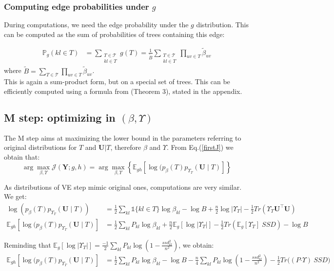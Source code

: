 \documentclass[11pt,a4paper]{article}
\newcommand{\argmax}{\arg\!\max}
\newcommand{\Ybf}{\boldsymbol{Y}}
\newcommand{\Ubf}{\boldsymbol{U}}
\newcommand{\Esp}{\mathds{E}}
\newcommand{\had}{\boldsymbol{\cdot}}
\begin{document}
\subsubsection{Computing edge probabilities under $g$}
During computations, we need the edge probability under the $g$ distribution. This can be computed as the sum of probabilities of trees containing this edge:

\begin{align*}
\mathds{P}_g(kl \in T)  &= \sum_{\substack{T  \in \mathcal{T} \\ kl \in T }} g(T) =\frac{1}{\widetilde{B}} \sum_{\substack{T  \in \mathcal{T} \\ kl \in T }} \prod_{uv \in T} \widetilde{\beta}_{uv}
\end{align*}
where $\displaystyle \widetilde{B}= \sum_{T \in \mathcal{T} }\prod_{uv \in T}  \widetilde{\beta}_{uv}$.\\

 This is again a sum-product form, but on a special set of trees. This can be efficiently computed using a formula from \citet{kirshner} (Theorem 3), stated in the appendix.
 
 
 \subsection{M step: optimizing in $(\beta, \Upsilon)$}
 The M step aims at maximizing the lower bound in the parameters referring to original distributions for $T$ and $\Ubf|T$, therefore $\beta$ and $\Upsilon$. From Eq.(\ref{firstJ}) we obtain that: 
$$ \argmax_{\beta, \Upsilon} \mathcal{J}(\Ybf ; g,h) =\argmax_{\beta, \Upsilon} \left\{ \Esp_{gh} [\log (p_\beta(T)p_{\Upsilon_T}(\Ubf\mid T) ]\right\} $$

As distributions of VE step mimic original ones, computations are very similar. We get:
\begin{align*}
\log (p_\beta(T)p_{\Upsilon_T}(\Ubf\mid T))  &= \frac{1}{2}\sum_{kl} \mathds{1}\{kl \in T\} \log \beta_{kl} - \log B + \frac{n}{2}\log |\Upsilon_T| - \frac{1}{2}Tr(\Upsilon_T \Ubf^\intercal \Ubf)\\
\Esp_{gh} [\log (p_\beta(T)p_{\Upsilon_T}(\Ubf\mid T) ] &= \frac{1}{2}\sum_{kl} P_{kl} \log\beta_{kl} +\frac{n}{2} \Esp_g[\log |\Upsilon_T|] -\frac{1}{2} Tr(\Esp_g [\Upsilon_T] \; SSD)- \log B
\end{align*}

Reminding that $\Esp_g[\log |\Upsilon_{T}|]= \frac{-1}{2}\sum _{kl} P_{kl}  \log \left(1-\frac{ssd_{kl}^2}{n^2}\right)$,  we obtain:
\begin{align*}
\Esp_{gh} [\log (p_\beta(T)p_{\Upsilon_T}(\Ubf\mid T) ] &=\frac{1}{2}\sum_{kl} P_{kl} \log  \beta_{kl} - \log B - \frac{n}{4} \sum_{kl} P_{kl} \log\left(1-\frac{ssd_{kl}^2}{n^2}\right)  - \frac{1}{2}Tr\big( (P \had \Upsilon)\: SSD\big) 
\end{align*}
 
\end{document}
